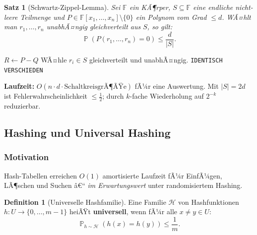 ﻿\documentclass[12pt,a4paper]{article}
\theoremstyle{definition}
\newtheorem{definition}{Definition}[section]
\theoremstyle{plain}
\newtheorem{satz}{Satz}[section]
\theoremstyle{remark}
\DeclareMathOperator{\Prob}{\mathbb{P}}
\begin{document}
\begin{satz}[Schwartz-Zippel-Lemma]\label{satz:sz}
  Sei $\mathbb{F}$ ein KÃ¶rper, $S \subseteq \mathbb{F}$ eine endliche
  nicht-leere Teilmenge und $P \in \mathbb{F}[x_1,\ldots,x_n]\setminus\{0\}$
  ein Polynom vom Grad $\leq d$. WÃ¤hlt man $r_1, \ldots, r_n$ unabhÃ¤ngig
  gleichverteilt aus $S$, so gilt:
  \[
    \Prob(P(r_1, \ldots, r_n) = 0) \leq \frac{d}{|S|}.
  \]
\end{satz}

\begin{algorithm}[H]
  \caption{Randomisierter Polynom-IdentitÃ¤tstest (Schwartz-Zippel)}
  \label{alg:sz}
  \begin{algorithmic}[1]
    \State $R \gets P - Q$
      \State WÃ¤hle $r_i \in S$ gleichverteilt und unabhÃ¤ngig.
    \EndFor
      \State \Return \texttt{IDENTISCH} \Comment{Falsch-Positiv mit $\Prob \leq d/|S| \leq 1/2$}
    \Else
      \State \Return \texttt{VERSCHIEDEN} 
    \EndIf
  \end{algorithmic}
\end{algorithm}

\textbf{Laufzeit:} $O(n \cdot d \cdot \text{SchaltkreisgrÃ¶ÃŸe})$ fÃ¼r eine
Auswertung. Mit $|S| = 2d$ ist Fehlerwahrscheinlichkeit $\leq \frac{1}{2}$;
durch $k$-fache Wiederholung auf $2^{-k}$ reduzierbar.

\subsection{Hashing und Universal Hashing}
\label{subsec:hashing}

\subsubsection{Motivation}

Hash-Tabellen erreichen $O(1)$ amortisierte Laufzeit fÃ¼r EinfÃ¼gen, LÃ¶schen
und Suchen â€“ \emph{im Erwartungswert} unter randomisiertem Hashing.

\begin{definition}[Universelle Hashfamilie]\label{def:uhash}
  Eine Familie $\mathcal{H}$ von Hashfunktionen $h: U \to \{0,\ldots,m-1\}$
  heiÃŸt \textbf{universell}, wenn fÃ¼r alle $x \neq y \in U$:
  \[
    \Prob_{h\sim\mathcal{H}}(h(x) = h(y)) \leq \frac{1}{m}.
  \]
\end{definition}
\end{document}
